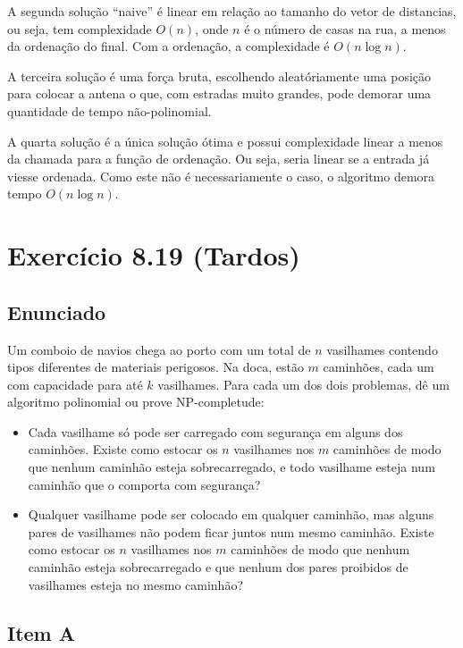 \documentclass[11pt]{article}
\begin{document}
A segunda solução ``naive'' é linear em relação ao tamanho do vetor de
distancias, ou seja, tem complexidade $O(n)$, onde $n$ é o número de
casas na rua, a menos da ordenação do final. Com a ordenação, a
complexidade é $O(n \log n)$.

A terceira solução é uma força bruta, escolhendo aleatóriamente uma
posição para colocar a antena o que, com estradas muito grandes, pode
demorar uma quantidade de tempo não-polinomial.

A quarta solução é a única solução ótima e possui complexidade linear
a menos da chamada para a função de ordenação. Ou seja, seria linear
se a entrada já viesse ordenada. Como este não é necessariamente o
caso, o algoritmo demora tempo $O(n\log n)$.
\pagebreak

\section{Exercício 8.19 (Tardos)}
\label{sec-6}

\subsection{Enunciado}
\label{sec-6-1}

Um comboio de navios chega ao porto com um total de $n$ vasilhames
contendo tipos diferentes de materiais perigosos.
Na doca, estão $m$ caminhões, cada um com capacidade para até $k$
vasilhames.  Para cada um dos dois problemas, dê um algoritmo
polinomial ou prove NP-completude:


\begin{itemize}
\item Cada vasilhame só pode ser carregado com segurança em alguns
dos caminhões. Existe como estocar os $n$ vasilhames nos $m$
caminhões de modo que nenhum caminhão esteja sobrecarregado, e
todo vasilhame esteja num caminhão que o comporta com segurança?

\item Qualquer vasilhame pode ser colocado em qualquer caminhão,
mas alguns pares de vasilhames não podem ficar juntos num mesmo
caminhão. Existe como estocar os $n$ vasilhames nos $m$
caminhões de modo que nenhum caminhão esteja sobrecarregado e
que nenhum dos pares proibidos de vasilhames esteja no mesmo
caminhão?
\end{itemize}

\subsection{Item A}
\label{sec-6-2}
\end{document}
